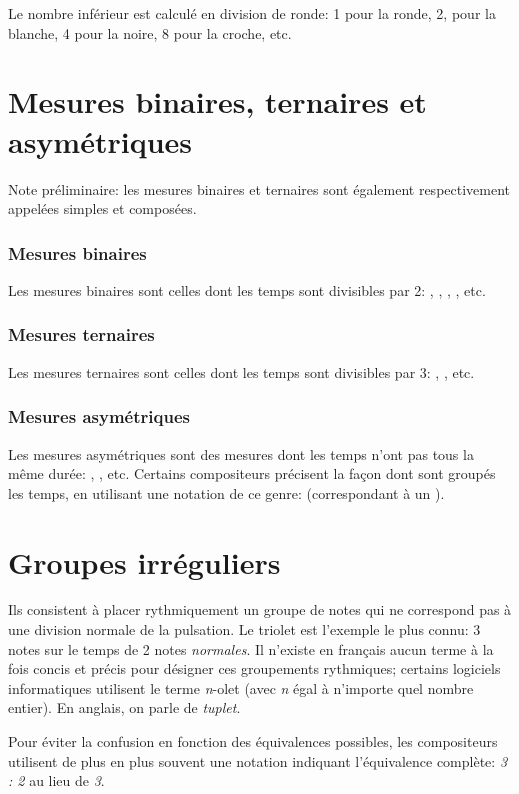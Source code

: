\documentclass[11pt]{scrreprt}
\begin{document}
Le nombre inférieur est calculé en division de ronde: 1 pour la ronde, 2, pour la blanche, 4 pour la noire, 8 pour la croche, etc.
\section{Mesures binaires, ternaires et asymétriques}
Note préliminaire: les mesures binaires et ternaires sont également respectivement appelées simples et composées.
\subsubsection{Mesures binaires}
Les mesures binaires sont celles dont les temps sont divisibles par 2: , , , , etc.
\subsubsection{Mesures ternaires}
Les mesures ternaires sont celles dont les temps sont divisibles par 3: , , etc.

\subsubsection{Mesures asymétriques}
Les mesures asymétriques sont des mesures dont les temps n'ont pas tous la même durée: , , etc. Certains compositeurs précisent la façon dont sont groupés les temps, en utilisant une notation de ce genre:  (correspondant à un ).

\section{Groupes irréguliers}
Ils consistent à placer rythmiquement un groupe de notes qui ne correspond pas à une division normale de la pulsation. Le triolet est l'exemple le plus connu: 3 notes sur le temps de 2 notes \emph{normales}.
Il n'existe en français aucun terme à la fois concis et précis pour désigner ces groupements rythmiques; certains logiciels informatiques utilisent le terme \emph{n}-olet (avec \emph{n} égal à n'importe quel nombre entier). En anglais, on parle de \emph{tuplet}.

Pour éviter la confusion en fonction des équivalences possibles, les compositeurs utilisent de plus en plus souvent une notation indiquant l'équivalence complète: \emph{3 : 2} au lieu de \emph{3}.
\end{document}
